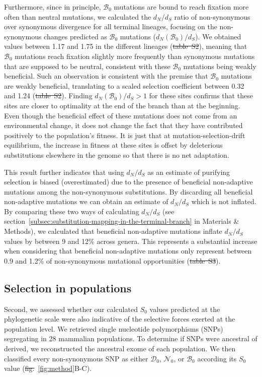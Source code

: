\documentclass[10pt,letterpaper]{article}
\newcommand{\dn}{d_N}
\newcommand{\ds}{d_S}
\newcommand{\dnds}{\dn / \ds}
\newcommand{\Sphy}{S_{0}}
\newcommand{\SphyDel}{\mathcal{D}_0}
\newcommand{\SphyNeu}{\mathcal{N}_0}
\newcommand{\SphyBen}{\mathcal{B}_0}
\providecommand{\DIFaddtex}[1]{{\protect\color{blue}\uwave{#1}}} %
\providecommand{\DIFdeltex}[1]{{\protect\color{red}\sout{#1}}}                      %
\providecommand{\DIFaddbegin}{} %
\providecommand{\DIFaddend}{} %
\providecommand{\DIFdelbegin}{} %
\providecommand{\DIFdelend}{} %
\providecommand{\DIFadd}[1]{\texorpdfstring{\DIFaddtex{#1}}{#1}} %
\providecommand{\DIFdel}[1]{\texorpdfstring{\DIFdeltex{#1}}{}} %
\newcommand{\DIFscaledelfig}{0.5}
\newlength{\DIFdelgraphicswidth} %
\newlength{\DIFdelgraphicsheight} %
\newcommand{\DIFaddincludegraphics}[2][]{{\color{blue}\fbox{\DIFOincludegraphics[#1]{#2}}}} %
\newcommand{\DIFdelincludegraphics}[2][]{%
\sbox{\DIFdelgraphicsbox}{\DIFOincludegraphics[#1]{#2}}%
\settoboxwidth{\DIFdelgraphicswidth}{\DIFdelgraphicsbox} %
\settoboxtotalheight{\DIFdelgraphicsheight}{\DIFdelgraphicsbox} %
\scalebox{\DIFscaledelfig}{%
\parbox[b]{\DIFdelgraphicswidth}{\usebox{\DIFdelgraphicsbox}\\[-\baselineskip] \rule{\DIFdelgraphicswidth}{0em}}\llap{\resizebox{\DIFdelgraphicswidth}{\DIFdelgraphicsheight}{%
\setlength{\unitlength}{\DIFdelgraphicswidth}%
\begin{picture}(1,1)%
\thicklines\linethickness{2pt} %
{\color[rgb]{1,0,0}\put(0,0){\framebox(1,1){}}}%
{\color[rgb]{1,0,0}\put(0,0){\line( 1,1){1}}}%
{\color[rgb]{1,0,0}\put(0,1){\line(1,-1){1}}}%
\end{picture}%
}\hspace*{3pt}}} %
} %
\DeclareRobustCommand{\DIFaddbegin}{\DIFOaddbegin \let\includegraphics\DIFaddincludegraphics} %
\DeclareRobustCommand{\DIFaddend}{\DIFOaddend \let\includegraphics\DIFOincludegraphics} %
\DeclareRobustCommand{\DIFdelbegin}{\DIFOdelbegin \let\includegraphics\DIFdelincludegraphics} %
\DeclareRobustCommand{\DIFdelend}{\DIFOaddend \let\includegraphics\DIFOincludegraphics} %
\begin{document}
Furthermore, since in principle, $\SphyBen$ mutations are bound to reach fixation more often than neutral mutations, we calculated the $\dnds$ ratio of non-synonymous over synonymous divergence for all terminal lineages, focusing on the non-synonymous changes predicted as $\SphyBen$ mutations ($\dn(\SphyBen) / \ds$).
We obtained values between 1.17 and 1.75 in the different lineages (\DIFdelbegin \DIFdel{table~S2}\DIFdelend \DIFaddbegin {}\DIFaddend ), meaning that $\SphyBen$ mutations reach fixation slightly more frequently than synonymous mutations that are supposed to be neutral, consistent with these $\SphyBen$ mutations being weakly beneficial.
Such an observation is consistent with the premise that $\SphyBen$ mutations are weakly beneficial, translating to a scaled selection coefficient between 0.32 and 1.24 (\DIFdelbegin \DIFdel{table~S2}\DIFdelend \DIFaddbegin {}\DIFaddend ).
Finding $\dn(\SphyBen) / \ds > 1$ for these sites confirms that these sites are closer to optimality at the end of the branch than at the beginning.
Even though the beneficial effect of these mutations does not come from an environmental change, it does not change the fact that they have contributed positively to the population’s fitness.
It is just that at mutation-selection-drift equilibrium, the increase in fitness at these sites is offset by deleterious substitutions elsewhere in the genome so that there is no net adaptation.

This result further indicates that using $\dnds$ as an estimate of purifying selection is biased (overestimated) due to the presence of beneficial non-adaptive mutations among the non-synonymous substitutions.
By discarding all beneficial non-adaptive mutations we can obtain an estimate of $\dnds$ which is not inflated.
By comparing these two ways of calculating $\dnds$ (see section~\ref{subsec:substitution-mapping-in-the-terminal-branch} in Materials \& Methods), we calculated that beneficial non-adaptive mutations inflate $\dnds$ values by between 9 and 12\% across genera.
This represents a substantial increase when considering that beneficial non-adaptive mutations only represent between 0.9 and 1.2\% of non-synonymous mutational opportunities (\DIFdelbegin \DIFdel{table~S3}\DIFdelend \DIFaddbegin {}\DIFaddend ).


\subsection*{Selection in populations}
Second, we assessed whether our calculated $\Sphy$ values predicted at the phylogenetic scale were also indicative of the selective forces exerted at the population level.
We retrieved single nucleotide polymorphisms (SNPs) segregating in 28 mammalian populations.
To determine if SNPs were ancestral of derived, we reconstructed the ancestral exome of each population.
We then classified every non-synonymous SNP as either $\SphyDel$, $\SphyNeu$, or $\SphyBen$ according its $\Sphy$ value (\DIFdelbegin \DIFdel{fig.}\DIFdelend \DIFaddbegin \DIFadd{Fig}\DIFaddend ~\ref{fig:method}B-C).
\end{document}
